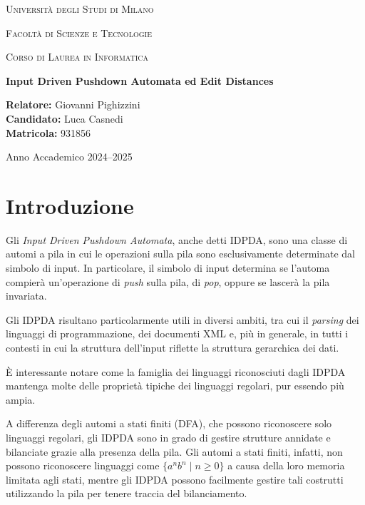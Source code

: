 \documentclass[a4paper,12pt]{report}
\theoremstyle{propositionstyle}
\begin{document}
    \begin{titlepage}
        \centering
        {\scshape\LARGE Università degli Studi di Milano \par}
        \vspace{1cm}
        {\scshape\Large Facoltà di Scienze e Tecnologie \par}
        \vspace{0.5cm}
        {\scshape\large Corso di Laurea in Informatica\par}
        \vspace{2cm}
        {\huge\bfseries Input Driven Pushdown Automata ed Edit Distances\par}
        \vspace{2cm}
        \begin{flushleft}
            \textbf{Relatore:} Giovanni Pighizzini\\
            \textbf{Candidato:} Luca Casnedi\\
            \textbf{Matricola:} 931856
        \end{flushleft}
        \vfill
        {\large Anno Accademico 2024--2025\par}
    \end{titlepage}

    \tableofcontents
    \clearpage


    \chapter{Introduzione}

    Gli \emph{Input Driven Pushdown Automata}, anche detti IDPDA, sono una classe di automi a pila in cui le operazioni sulla pila sono esclusivamente determinate dal simbolo di input.
    In particolare, il simbolo di input determina se l'automa compierà un'operazione di \emph{push} sulla pila, di \emph{pop}, oppure se lascerà la pila invariata.

    Gli IDPDA risultano particolarmente utili in diversi ambiti, tra cui il \emph{parsing} dei linguaggi di programmazione, dei documenti XML e, più in generale, in tutti i contesti in cui la struttura dell'input riflette la struttura gerarchica dei dati.

    È interessante notare come la famiglia dei linguaggi riconosciuti dagli IDPDA mantenga molte delle proprietà tipiche dei linguaggi regolari, pur essendo più ampia.

    A differenza degli automi a stati finiti (DFA), che possono riconoscere solo linguaggi regolari, gli IDPDA sono in grado di gestire strutture annidate e bilanciate grazie alla presenza della pila.
    Gli automi a stati finiti, infatti, non possono riconoscere linguaggi come $\{a^n b^n \mid n \geq 0\}$ a causa della loro memoria limitata agli stati, mentre gli IDPDA possono facilmente gestire tali costrutti utilizzando la pila per tenere traccia del bilanciamento.
\end{document}
